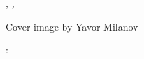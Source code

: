 \thispagestyle{empty}

\hfill

\vfill

\noindent\myName, \textit{\myTitle,} %
\myTime

\noindent Cover image by Yavor Milanov

\bigskip
\noindent{}: \myDOI

%
%
%
%
%
